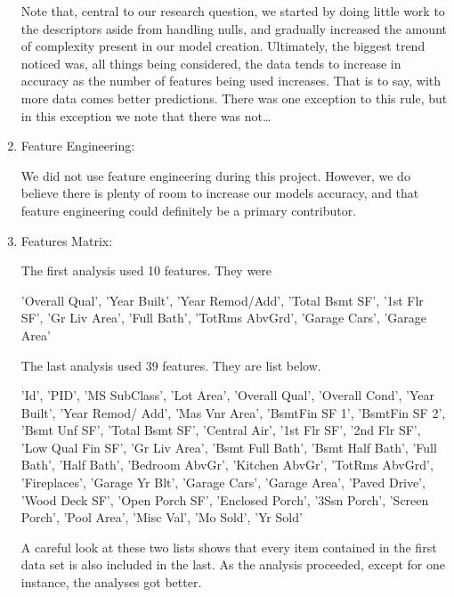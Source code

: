 \documentclass[10pt]{article}
\begin{document}
\begin{enumerate}[\null]
\begin{itemize}
\end{itemize}

\hspace{5mm} Note that, central to our research question, we started by doing little work to the descriptors aside from handling nulls, and gradually increased the amount of complexity present in our model creation.  Ultimately, the biggest trend noticed was, all things being considered, the data tends to increase in accuracy as the number of features being used increases.  That is to say, with more data comes better predictions.  There was one exception to this rule, but in this exception we note that there was not\dots

\item Feature Engineering:

\hspace{5mm} We did not use feature engineering during this project.  However, we do believe there is plenty of room to increase our models accuracy, and that feature engineering could definitely be a primary contributor. 
    
\item Features Matrix: 

\hspace{5mm} The first analysis used 10 features.  They were

'Overall Qual', 'Year Built', 'Year Remod/Add', 'Total Bsmt SF',
       '1st Flr SF', 'Gr Liv Area', 'Full Bath', 'TotRms AbvGrd',
       'Garage Cars', 'Garage Area'

\hspace{5mm} The last analysis used 39 features.  They are list below.

'Id', 'PID', 'MS SubClass', 'Lot Area', 'Overall Qual', 'Overall Cond', 'Year Built', 'Year Remod/	Add', 'Mas Vnr Area', 'BsmtFin SF 1', 'BsmtFin SF 2', 'Bsmt Unf SF', 'Total Bsmt SF', 	'Central Air', '1st Flr SF', '2nd Flr SF', 'Low Qual Fin SF', 'Gr Liv Area', 'Bsmt Full Bath', 	'Bsmt Half Bath', 'Full Bath', 'Half Bath', 'Bedroom AbvGr', 'Kitchen AbvGr', 'TotRms 		AbvGrd', 'Fireplaces', 'Garage Yr Blt', 'Garage Cars', 'Garage Area', 'Paved Drive', 'Wood 	Deck SF', 'Open Porch SF', 'Enclosed Porch', '3Ssn Porch', 'Screen Porch', 'Pool Area', 	'Misc Val', 'Mo Sold', 'Yr Sold'

\hspace{5mm} A careful look at these two lists shows that every item contained in the first data set is also included in the last.  As the analysis proceeded, except for one instance, the analyses got better.
    

\end{enumerate}
\end{document}
